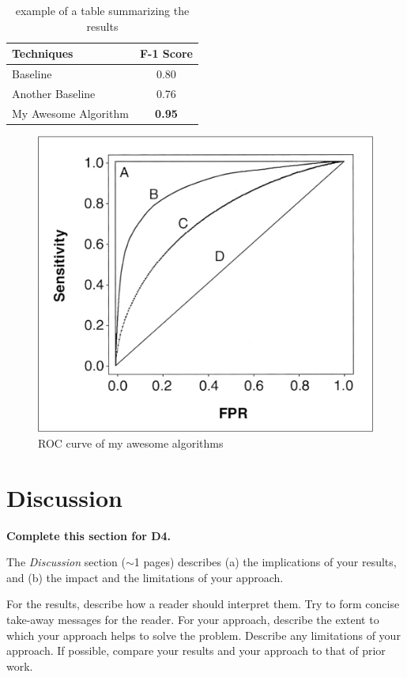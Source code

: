 \documentclass[letterpaper]{article} %
\begin{document}
\begin{table}[h!]
    \centering
    \normalsize{
    \begin{tabular}{ l c }
    \hline
         Techniques & F-1 Score\\
         \hline
          Baseline & 0.80 \\
          Another Baseline & 0.76\\
          My Awesome Algorithm & {\bf 0.95}\\
         \hline
    \end{tabular}}
    \caption{example of a table summarizing the results}
    \label{tab:results1}
\end{table} 

\begin{figure}[htbp!]
  \centering
  \includegraphics[width=0.9\linewidth]{figures/roc.png}
  \caption{ROC curve of my awesome algorithms}
  \label{fig:results2}
\end{figure}



\section{Discussion}

{\bf Complete this section for D4.}

The {\it Discussion} section ($\sim$1 pages) describes (a) the implications of your results, and (b) the impact and the limitations of your approach.  

For the results, describe how a reader should interpret them.  Try to form concise take-away messages for the reader.  For your approach, describe the extent to which your approach helps to solve the problem.  Describe any limitations of your approach.  If possible, compare your results and your approach to that of prior work. 
\end{document}

